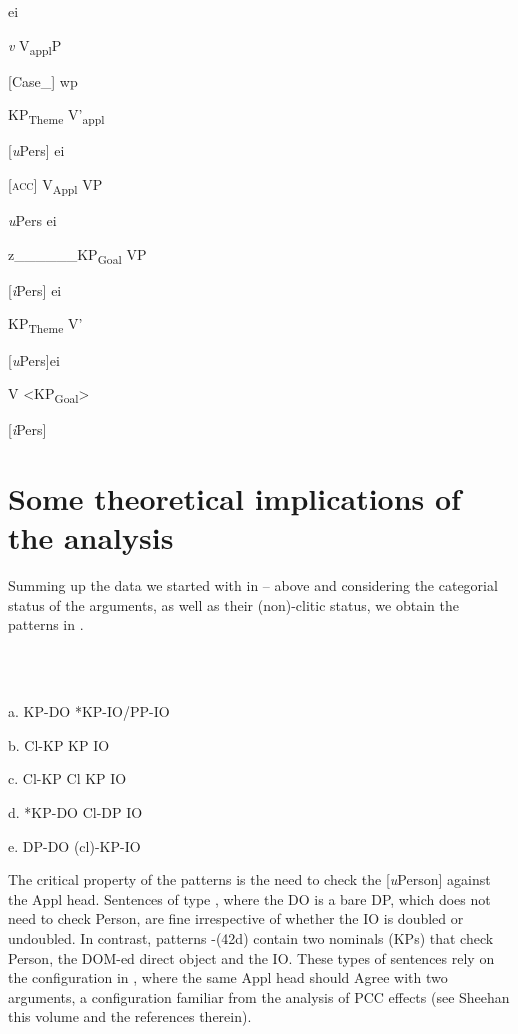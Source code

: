 \documentclass[output=paper,modfonts,nonflat]{langsci/langscibook}
\begin{document}
        ei

        \textit{v}    V\textsubscript{appl}P

        [Case\_]     wp

          KP\textsubscript{Theme}    V’\textsubscript{appl}

          [\textit{u}Pers]             ei

          [\textsc{acc}]  V\textsubscript{Appl}    VP

            \textit{u}Pers  ei

            z\_\_\_\_\_\_KP\textsubscript{Goal}    VP

              [\textit{i}Pers]  ei

              KP\textsubscript{Theme}  V’

              [\textit{u}Pers]ei

                V            <KP\textsubscript{Goal}>

                  [\textit{i}Pers]

\section{Some theoretical implications of the analysis} %

Summing up the data we started with in  –  above and considering the categorial status of the arguments, as well as their (non)-clitic status, we obtain the patterns in . 

\ea%
    \label{ex:key:42}
    \gll\\
        \\
    \glt
    \z

           a.  KP-DO    *KP-IO/PP-IO

b.  Cl-KP      KP IO

c.  Cl-KP      Cl KP IO

d.  *KP-DO    Cl-DP IO

 e.  DP-DO    (cl)-KP-IO 

The critical property of the patterns is the need to check the [\textit{u}Person] against the Appl head. Sentences of type , where the DO is a bare DP, which does not need to check Person, are fine irrespective of whether the IO is doubled or undoubled. In contrast, patterns -(42d) contain two nominals (KPs) that check Person, the DOM-ed direct object and the IO. These types of sentences rely on the configuration in , where the same Appl head should Agree with two arguments, a configuration familiar from the analysis of PCC effects (see Sheehan this volume and the references therein). 
\end{document}
